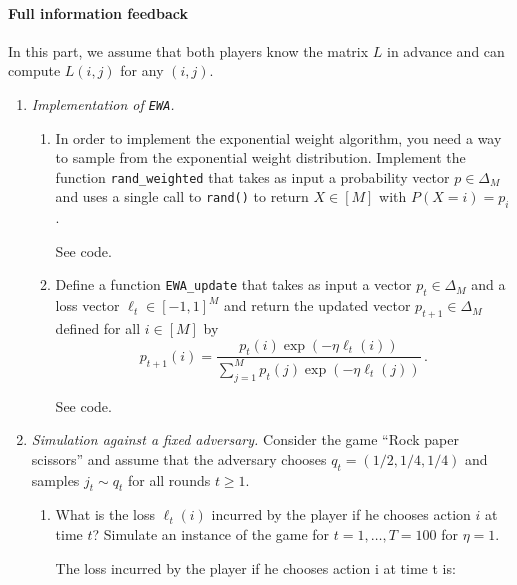 \paragraph{Full information feedback}
In this part, we assume that both players know the matrix $L$ in advance and can compute $L(i,j)$ for any $(i,j)$. 

\begin{enumerate}[resume]
	\item \emph{Implementation of \lstinline{EWA}.} 
	\begin{enumerate}[label=(\alph*)] 
		\item In order to implement the exponential weight algorithm, you need a way to sample from the exponential weight distribution. Implement the function \lstinline{rand_weighted} that takes as input a probability vector $p \in \Delta_M$ and uses a single call to \lstinline{rand()} to return $X \in [M]$ with $P(X = i) = p_i$.
		
	    \begin{solution}
    See code.
        \end{solution}


		\item Define a function \lstinline{EWA_update} that takes as input a vector $p_t \in \Delta_M$ and a loss vector $\ell_t \in [-1,1]^M$ and return the updated vector $p_{t+1} \in \Delta_M$ defined for all $i \in [M]$ by
		\begin{equation*}
			p_{t+1}(i) = \frac{p_t(i) \exp(-\eta \ell_t(i))}{\sum_{j=1}^M p_t(j) \exp(-\eta \ell_t(j))} \,.
		\end{equation*}
		
	    \begin{solution}
    See code.
        \end{solution}
	\end{enumerate}

	\item \emph{Simulation against a fixed adversary.} Consider the game ``Rock paper scissors'' and assume that the adversary chooses $q_t = (1/2, 1/4, 1/4)$ and samples $j_t \sim q_t$ for all rounds $t \geq 1$. 
	\begin{enumerate}[label=(\alph*)]
		\item What is the loss $\ell_t(i)$ incurred by the player if he chooses action $i$ at time $t$? Simulate an instance of the game for $t = 1,\dots, T= 100$ for $\eta = 1$.
		
	    \begin{solution}
    The loss incurred by the player if he chooses action i at time t is:
    

\end{solution}
\end{enumerate}
\end{enumerate}
